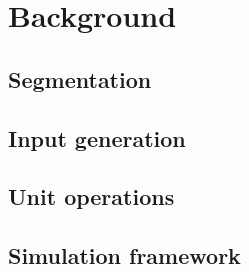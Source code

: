 \chapter{Background}\label{chap:background}
\begin{overview}

\end{overview}

\section{Segmentation}

\section{Input generation}

\section{Unit operations}

\section{Simulation framework}

